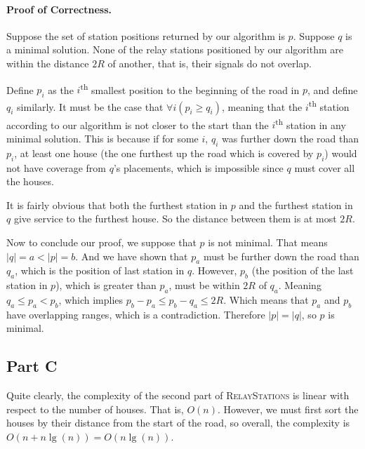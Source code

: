 \documentclass{article}
\begin{document}
\paragraph{Proof of Correctness.} Suppose the set of station positions returned by our algorithm is \(p\). Suppose \(q\) is a minimal solution. None of the relay stations positioned by our algorithm are within the distance \(2R\) of another, that is, their signals do not overlap.

Define \(p_i\) as the \(i\)\textsuperscript{th} smallest position to the beginning of the road in \(p\), and define \(q_i\) similarly. It must be the case that \(\forall i (p_i \geq q_i)\), meaning that the \(i\)\textsuperscript{th} station according to our algorithm is not closer to the start than the \(i\)\textsuperscript{th} station in any minimal solution. This is because if for some \(i\), \(q_i\) was further down the road than \(p_i\), at least one house (the one furthest up the road which is covered by \(p_i\)) would not have coverage from \(q\)'s placements, which is impossible since \(q\) must cover all the houses.

It is fairly obvious that both the furthest station in \(p\) and the furthest station in \(q\) give service to the furthest house. So the distance between them is at most \(2R\).

Now to conclude our proof, we suppose that \(p\) is not minimal. That means \(|q| = a < |p| = b\). And we have shown that \(p_a\) must be further down the road than \(q_a\), which is the position of last station in \(q\). However, \(p_b\) (the position of the last station in \(p\)), which is greater than \(p_a\), must be within \(2R\) of \(q_a\). Meaning \(q_a \leq p_a < p_b\), which implies \(p_b - p_a \leq p_b - q_a \leq 2R\). Which means that \(p_a\) and \(p_b\) have overlapping ranges, which is a contradiction. Therefore \(|p| = |q|\), so \(p\) is minimal.

\subsection*{Part C}

Quite clearly, the complexity of the second part of \textsc{RelayStations} is linear with respect to the number of houses. That is, \(O(n)\). However, we must first sort the houses by their distance from the start of the road, so overall, the complexity is \(O(n + n\lg(n)) = O(n\lg(n))\).
\end{document}
